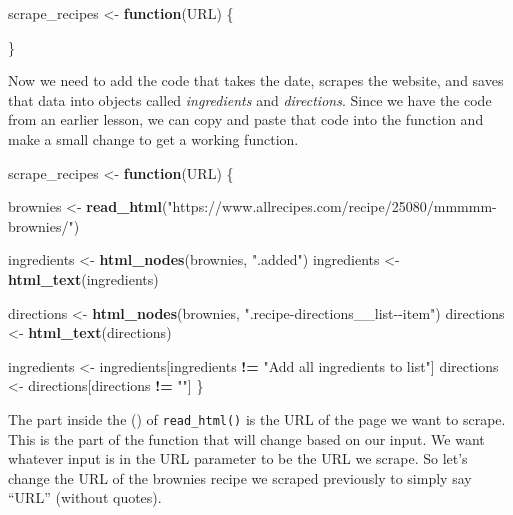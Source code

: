 \documentclass[
  12pt,
]{book}
\newenvironment{Shaded}{\begin{snugshade}}{\end{snugshade}}
\newcommand{\ControlFlowTok}[1]{\textcolor[rgb]{0.13,0.29,0.53}{\textbf{#1}}}
\newcommand{\KeywordTok}[1]{\textcolor[rgb]{0.13,0.29,0.53}{\textbf{#1}}}
\newcommand{\NormalTok}[1]{#1}
\newcommand{\OperatorTok}[1]{\textcolor[rgb]{0.81,0.36,0.00}{\textbf{#1}}}
\newcommand{\StringTok}[1]{\textcolor[rgb]{0.31,0.60,0.02}{#1}}
\begin{document}
\begin{Shaded}
\begin{Highlighting}[]
\NormalTok{scrape\_recipes <{-}}\StringTok{ }\ControlFlowTok{function}\NormalTok{(URL) \{}
  
\NormalTok{\}}
\end{Highlighting}
\end{Shaded}

Now we need to add the code that takes the date, scrapes the website, and saves that data into objects called \emph{ingredients} and \emph{directions}. Since we have the code from an earlier lesson, we can copy and paste that code into the function and make a small change to get a working function.

\begin{Shaded}
\begin{Highlighting}[]
\NormalTok{scrape\_recipes <{-}}\StringTok{ }\ControlFlowTok{function}\NormalTok{(URL) \{}
  
\NormalTok{  brownies <{-}}\StringTok{ }\KeywordTok{read\_html}\NormalTok{(}\StringTok{"https://www.allrecipes.com/recipe/25080/mmmmm{-}brownies/"}\NormalTok{)}
  
\NormalTok{  ingredients <{-}}\StringTok{ }\KeywordTok{html\_nodes}\NormalTok{(brownies, }\StringTok{".added"}\NormalTok{)}
\NormalTok{  ingredients <{-}}\StringTok{ }\KeywordTok{html\_text}\NormalTok{(ingredients)}
  
\NormalTok{  directions <{-}}\StringTok{ }\KeywordTok{html\_nodes}\NormalTok{(brownies, }\StringTok{".recipe{-}directions\_\_list{-}{-}item"}\NormalTok{)}
\NormalTok{  directions <{-}}\StringTok{ }\KeywordTok{html\_text}\NormalTok{(directions)}
  
\NormalTok{  ingredients <{-}}\StringTok{ }\NormalTok{ingredients[ingredients }\OperatorTok{!=}\StringTok{ "Add all ingredients to list"}\NormalTok{]}
\NormalTok{  directions <{-}}\StringTok{ }\NormalTok{directions[directions }\OperatorTok{!=}\StringTok{ ""}\NormalTok{]}
\NormalTok{\}}
\end{Highlighting}
\end{Shaded}

The part inside the () of \texttt{read\_html()} is the URL of the page we want to scrape. This is the part of the function that will change based on our input. We want whatever input is in the URL parameter to be the URL we scrape. So let's change the URL of the brownies recipe we scraped previously to simply say ``URL'' (without quotes).
\end{document}
